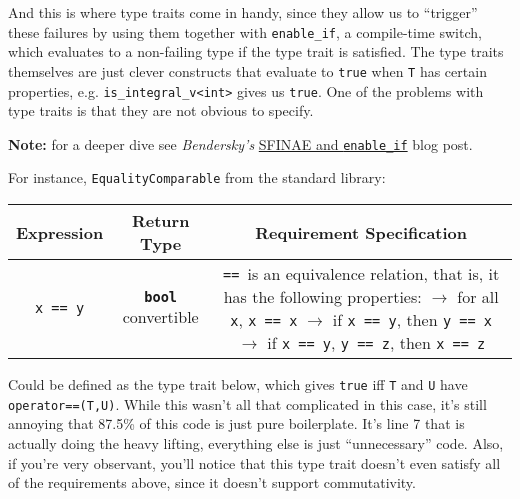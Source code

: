     And this is where type traits come in handy, since they allow us to ``trigger'' these failures by using them together with \texttt{enable\_if}, a compile-time switch, which evaluates to a non-failing type if the type trait is satisfied. The type traits themselves are just clever constructs that evaluate to \texttt{true} when \texttt{T} has certain properties, e.g. \texttt{is\_integral\_v<int>} gives us \texttt{true}. One of the problems with type traits is that they are not obvious to specify.

    \noindent \textbf{Note:} for a deeper dive see \emph{Bendersky's} \href{https://eli.thegreenplace.net/2014/sfinae-and-enable_if/}{SFINAE and \texttt{enable\_if}} blog post.

    For instance, \texttt{EqualityComparable} from the  standard library:

    \begin{table}[h]
    \begin{tabular}{ccc}
        \toprule
        \bf{Expression} & \bf{Return Type} & \bf{Requirement Specification} \\
        \midrule
        \texttt{x == y} & \textbf{\texttt{bool}} convertible & \makecell[l]{\texttt{==}\, is an equivalence relation, that is,\\
                                                                it has the following properties:\\
                                                                $\rightarrow$ for all \texttt{x}, \texttt{x == x}\\
                                                                $\rightarrow$ if \texttt{x == y}, then \texttt{y == x}\\
                                                                $\rightarrow$ if \texttt{x == y}, \texttt{y == z}, then \texttt{x == z}} \\
        \bottomrule
    \end{tabular}
    \end{table}

    \noindent Could be defined as the type trait below, which gives \texttt{true} iff \texttt{T} and \texttt{U} have \texttt{operator==(T,U)}. While this wasn't all that complicated in this case, it's still annoying that 87.5\% of this code is just pure boilerplate. It's line 7 that is actually doing the heavy lifting, everything else is just ``unnecessary'' code. Also, if you're very observant, you'll notice that this type trait doesn't even satisfy all of the requirements above, since it doesn't support commutativity.

